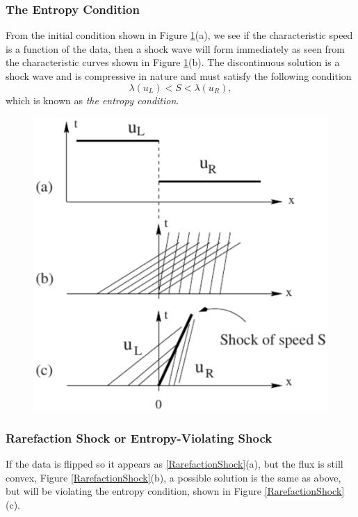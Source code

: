 \documentclass[]{article}
\begin{document}
		\subsubsection{The Entropy Condition}
	
			From the initial condition shown in  Figure \ref{ShockWave}(a), we see if the characteristic speed is a function of the data, then a shock wave will form immediately as seen from the characteristic curves shown in Figure \ref{ShockWave}(b). The discontinuous solution is a shock wave and is compressive in nature and must satisfy the following condition
			\begin{equation}
				\lambda(u_L) < S < \lambda(u_R),
			\end{equation}
			which is known as \textit{the entropy condition}.
			\begin{figure}[h] 	
				\centering
				\includegraphics[scale=.50]{ShockWave}
				\caption{}
				\label{ShockWave}
			\end{figure}

		\subsubsection{Rarefaction Shock or Entropy-Violating Shock}
			If the data is flipped so it appears as \ref{RarefactionShock}(a), but the flux is still convex, Figure \ref{RarefactionShock}(b), a possible solution is the same as above, but will be violating the entropy condition, shown in Figure \ref{RarefactionShock}(c).
	
\end{document}
